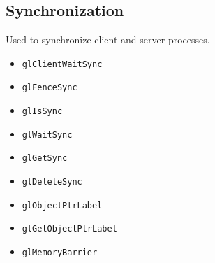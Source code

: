 \documentclass[12pt]{article}
\begin{document}
\subsection{Synchronization}
Used to synchronize client and server processes.
\begin{itemize}
\item \texttt{glClientWaitSync}
\item \texttt{glFenceSync}
\item \texttt{glIsSync}
\item \texttt{glWaitSync}
\item \texttt{glGetSync}
\item \texttt{glDeleteSync}
\item \texttt{glObjectPtrLabel}
\item \texttt{glGetObjectPtrLabel}
\item \texttt{glMemoryBarrier}
\end{itemize}
\end{document}
